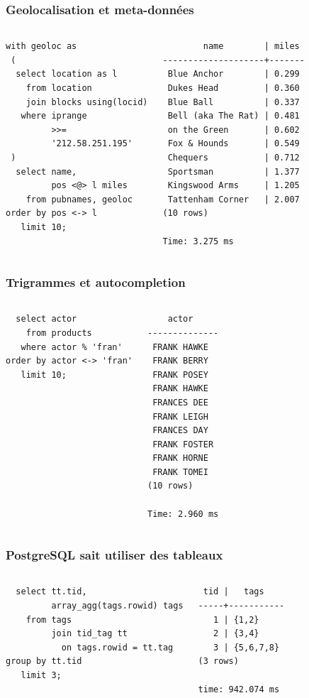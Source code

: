 \documentclass{beamer}
\begin{document}
\begin{frame}[fragile]
  \frametitle{Geolocalisation et meta-données}

\begin{columns}
\begin{verbatim}
with geoloc as
 (
  select location as l
    from location
    join blocks using(locid)
   where iprange
         >>=
         '212.58.251.195'
 )
  select name,
         pos <@> l miles
    from pubnames, geoloc
order by pos <-> l
   limit 10;
\end{verbatim}  
\begin{verbatim}
        name        | miles 
--------------------+-------
 Blue Anchor        | 0.299
 Dukes Head         | 0.360
 Blue Ball          | 0.337
 Bell (aka The Rat) | 0.481
 on the Green       | 0.602
 Fox & Hounds       | 0.549
 Chequers           | 0.712
 Sportsman          | 1.377
 Kingswood Arms     | 1.205
 Tattenham Corner   | 2.007
(10 rows)

Time: 3.275 ms
\end{verbatim}  
\end{columns}
\end{frame}

\begin{frame}[fragile]
  \frametitle{Trigrammes et autocompletion}

\begin{columns}
\begin{verbatim}
  select actor
    from products
   where actor % 'fran'
order by actor <-> 'fran'
   limit 10;
\end{verbatim}  
\begin{verbatim}
    actor     
--------------
 FRANK HAWKE
 FRANK BERRY
 FRANK POSEY
 FRANK HAWKE
 FRANCES DEE
 FRANK LEIGH
 FRANCES DAY
 FRANK FOSTER
 FRANK HORNE
 FRANK TOMEI
(10 rows)

Time: 2.960 ms
\end{verbatim}  
\end{columns}
\end{frame}

\begin{frame}[fragile]
  \frametitle{PostgreSQL sait utiliser des tableaux}

\begin{columns}
\begin{verbatim}
  select tt.tid,
         array_agg(tags.rowid) tags
    from tags
         join tid_tag tt
           on tags.rowid = tt.tag
group by tt.tid
   limit 3;
\end{verbatim}  
\begin{verbatim}
 tid |   tags    
-----+-----------
   1 | {1,2}
   2 | {3,4}
   3 | {5,6,7,8}
(3 rows)

time: 942.074 ms
\end{verbatim}  
\end{columns}
\end{frame}
\end{document}
